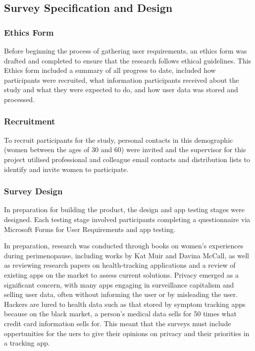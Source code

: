 \subsection{Survey Specification and Design}

\subsubsection{Ethics Form}
Before beginning the process of gathering user requirements, an ethics form was drafted and completed to ensure that the research follows ethical guidelines. This Ethics form included a summary of all progress to date, included how participants were recruited, what information participants received about the study and what they were expected to do, and how user data was stored and processed. 

\subsubsection{Recruitment}
To recruit participants for the study, personal contacts in this demographic (women between the ages of 30 and 60) were invited and the supervisor for this project utilised professional and colleague email contacts and distribution lists to identify and invite women to participate. 

\subsubsection{Survey Design}
In preparation for building the product, the design and app testing stages were designed. Each testing stage involved participants completing a questionnaire via Microsoft Forms for User Requirements and app testing. 

In preparation, research was conducted through books on women’s experiences during perimenopause, including works by Kat Muir\cite{Muir2022} and Davina McCall\cite{McCall2022}, as well as reviewing research papers on health-tracking applications and a review of existing apps on the market to assess current solutions. Privacy emerged as a significant concern, with many apps engaging in surveillance capitalism and selling user data, often without informing the user or by misleading the user\cite{Gilman2021}\cite{FTC2021}. Hackers are lured to health data such as that stored by symptom tracking apps because on the black market, a person's medical data sells for 50 times what credit card information sells for\cite{Rosato2020}. This meant that the surveys must include oppertunities for the uers to give their opinions on privacy and their priorities in a tracking app.

